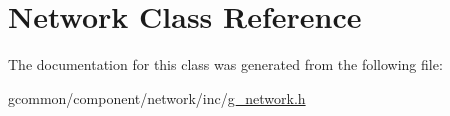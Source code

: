 \hypertarget{class_network}{\section{Network Class Reference}
\label{class_network}
}


The documentation for this class was generated from the following file\-:\begin{DoxyCompactItemize}
\item 
gcommon/component/network/inc/\hyperlink{g__network_8h}{g\-\_\-network.\-h}\end{DoxyCompactItemize}
